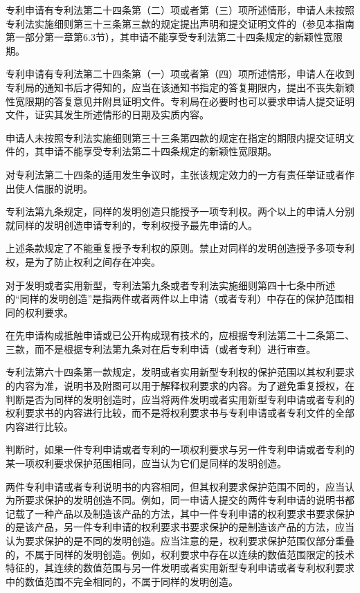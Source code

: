 专利申请有专利法第二十四条第（二）项或者第（三）项所述情形，申请人未按照专利法实施细则第三十三条第三款的规定提出声明和提交证明文件的（参见本指南第一部分第一章第6.3节），其申请不能享受专利法第二十四条规定的新颖性宽限期。

专利申请有专利法第二十四条第（一）项或者第（四）项所述情形，申请人在收到专利局的通知书后才得知的，应当在该通知书指定的答复期限内，提出不丧失新颖性宽限期的答复意见并附具证明文件。专利局在必要时也可以要求申请人提交证明文件，证实其发生所述情形的日期及实质内容。

申请人未按照专利法实施细则第三十三条第四款的规定在指定的期限内提交证明文件的，其申请不能享受专利法第二十四条规定的新颖性宽限期。

对专利法第二十四条的适用发生争议时，主张该规定效力的一方有责任举证或者作出使人信服的说明。

专利法第九条规定，同样的发明创造只能授予一项专利权。两个以上的申请人分别就同样的发明创造申请专利的，专利权授予最先申请的人。

上述条款规定了不能重复授予专利权的原则。禁止对同样的发明创造授予多项专利权，是为了防止权利之间存在冲突。

对于发明或者实用新型，专利法第九条或者专利法实施细则第四十七条中所述的“同样的发明创造”是指两件或者两件以上申请（或者专利）中存在的保护范围相同的权利要求。

在先申请构成抵触申请或已公开构成现有技术的，应根据专利法第二十二条第二、三款，而不是根据专利法第九条对在后专利申请（或者专利）进行审查。

专利法第六十四条第一款规定，发明或者实用新型专利权的保护范围以其权利要求的内容为准，说明书及附图可以用于解释权利要求的内容。为了避免重复授权，在判断是否为同样的发明创造时，应当将两件发明或者实用新型专利申请或者专利的权利要求书的内容进行比较，而不是将权利要求书与专利申请或者专利文件的全部内容进行比较。

判断时，如果一件专利申请或者专利的一项权利要求与另一件专利申请或者专利的某一项权利要求保护范围相同，应当认为它们是同样的发明创造。

两件专利申请或者专利说明书的内容相同，但其权利要求保护范围不同的，应当认为所要求保护的发明创造不同。例如，同一申请人提交的两件专利申请的说明书都记载了一种产品以及制造该产品的方法，其中一件专利申请的权利要求书要求保护的是该产品，另一件专利申请的权利要求书要求保护的是制造该产品的方法，应当认为要求保护的是不同的发明创造。应当注意的是，权利要求保护范围仅部分重叠的，不属于同样的发明创造。例如，权利要求中存在以连续的数值范围限定的技术特征的，其连续的数值范围与另一件发明或者实用新型专利申请或者专利权利要求中的数值范围不完全相同的，不属于同样的发明创造。

